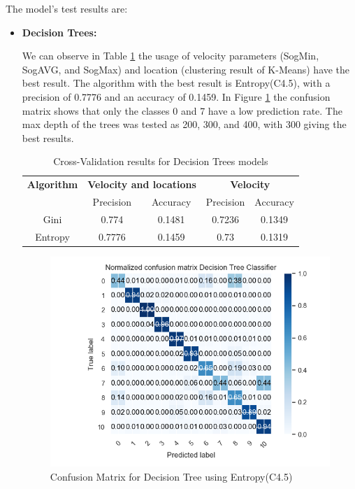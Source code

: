 The model's test results are:
\newpage
\begin{itemize}
\item \textbf{ Decision Trees: }

We can observe in Table \ref{table:cross_val_dt} the usage of velocity parameters (SogMin, SogAVG, and SogMax) and location (clustering result of K-Means) have the best result. The algorithm with the best result is Entropy(C4.5), with a precision of 0.7776 and an accuracy of 0.1459. In Figure \ref{table:cross_val_dt} the confusion matrix shows that only the classes 0 and 7 have a low prediction rate. The max depth of the trees was tested as 200, 300, and 400, with 300 giving the best results.


\begin {table}[H]
\begin{center}
\begin{tabular}{c|c|c|c|c}
\multicolumn{1}{c|}{\textbf{Algorithm } } &\multicolumn{2}{c|}{\textbf{ Velocity and locations}}& \multicolumn{2}{c}{\textbf{ Velocity}}\\
&Precision & Accuracy & Precision & Accuracy \\
\hline
Gini &0.774&0.1481&0.7236&0.1349\\
Entropy&0.7776&0.1459&0.73&0.1319
\label{table:cross_val_dt}
\end{tabular}
\caption {Cross-Validation results for Decision Trees models}
\end{center}
\end {table}

\begin{figure}[H]
\centering
\includegraphics[width=0.8\linewidth]{Chapters/img/CM_DT.png}
\caption{Confusion Matrix for Decision Tree using Entropy(C4.5)}
\label{fig:cm_dt}
\end{figure}



\end{itemize}
